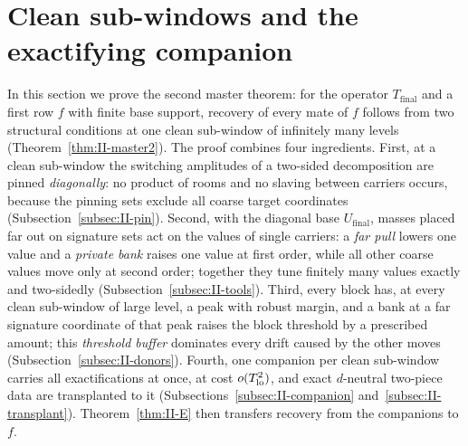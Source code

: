 \documentclass[10pt]{amsart}
\theoremstyle{definition}
\theoremstyle{remark}
\begin{document}

\section{Clean sub-windows and the exactifying companion}\label{sec:II-exact}

In this section we prove the second master theorem: for the operator
$T_{\mathrm{final}}$ and a first row $f$ with finite base support, recovery
of every mate of $f$ follows from two structural conditions at one clean
sub-window of infinitely many levels (Theorem~\ref{thm:II-master2}).  The
proof combines four ingredients.  First, at a clean sub-window the
switching amplitudes of a two-sided decomposition are pinned
\emph{diagonally}: no product of rooms and no slaving between carriers
occurs, because the pinning sets exclude all coarse target coordinates
(Subsection~\ref{subsec:II-pin}).  Second, with the diagonal base
$U_{\mathrm{final}}$, masses placed far out on signature sets act on the
values of single carriers: a \emph{far pull} lowers one value and a
\emph{private bank} raises one value at first order, while all other coarse
values move only at second order; together they tune finitely many values
exactly and two-sidedly (Subsection~\ref{subsec:II-tools}).  Third, every
block has, at every clean sub-window of large level, a peak with robust
margin, and a bank at a far signature coordinate of that peak raises the
block threshold by a prescribed amount; this \emph{threshold buffer}
dominates every drift caused by the other moves
(Subsection~\ref{subsec:II-donors}).  Fourth, one companion per clean
sub-window carries all exactifications at once, at cost $o(T_{\rm lo}^2)$,
and exact $d$-neutral two-piece data are transplanted to it
(Subsections~\ref{subsec:II-companion} and~\ref{subsec:II-transplant}).
Theorem~\ref{thm:II-E} then transfers recovery from the companions to $f$.
\end{document}
